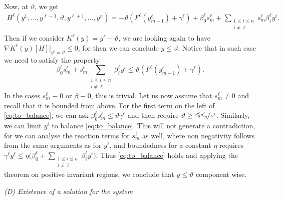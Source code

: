\documentclass[11pt]{article}
\numberwithin{equation}{section}
\begin{document}
Now, at \(\vartheta\), we get
\begin{align*}
	H^\ell( y^1, \ldots, y^{\ell-1}, \vartheta, y^{\ell+1}, \ldots, y^n ) 
	= -\vartheta ( F^\ell(y_{m-1}^\ell) + \gamma^\ell) + \beta_0^\ell s_m^\ell + \sum_{\substack{1\le i\le n\\ i\neq \ell}}  s_m^\ell \beta_i^\ell  y^i .
\end{align*}
Then if we consider \(K^\ell(y) = y^\ell - \vartheta \), we are looking again to have \(\nabla K^\ell(y)[H] \big|_{y^\ell = \vartheta} \leq 0\), for then we can conclude \( y \leq \vartheta\). 
%
Notice that in such case we need to satisfy the property
\begin{equation}
\label{eq:to_balance}
	\beta_0^\ell s_m^\ell + s_m^\ell \sum_{\substack{1\le i\le n\\ i\neq \ell}}  \beta_i^\ell  y^i \leq \vartheta ( F^\ell(y_{m-1}^\ell) + \gamma^\ell).
\end{equation}
In the cases \(s_m^\ell \equiv 0\) or \(\beta \equiv 0\), this is trivial. Let us now assume that \(s_m^\ell \neq 0 \) and recall that it is bounded from above. For the first term on the left of \eqref{eq:to_balance}, we can ask \( \beta_0^\ell s_m^\ell  \leq \vartheta  \gamma^\ell\) and then require \( \vartheta \geq \nicefrac{\beta_0^\ell s_m^\ell}{\gamma^\ell}\). Similarly, we can limit \(y^i\) to balance \eqref{eq:to_balance}.
This will not generate a contradiction, for we can analyse the reaction terms for \(s_{m}^\ell\) as well, where non negativity follows from the same arguments as for \(y^\ell\), and boundedness for a constant \(\eta\) requires
\(
	\gamma^\ell y^\ell 
	\leq \eta \big( \beta_0^\ell + \sum_{\substack{1\le i\le n\\ i\neq \ell}} \beta_i^\ell y^i\big)
\). Thus \eqref{eq:to_balance} holds and applying the theorem on positive invariant regions, we conclude that \( y\leq \vartheta\) component wise. 


\vspace{1\baselineskip}
\noindent\emph{(D) Existence of a solution for the system}
\vspace{0.5\baselineskip}
\end{document}
